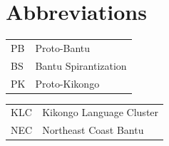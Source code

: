 \documentclass[output=paper,colorlinks,citecolor=brown
]{langscibook}
\begin{document}
 

\section*{Abbreviations}

\begin{tabularx}{.45\textwidth}{lQ}
PB & Proto-Bantu                \\
BS & Bantu Spirantization       \\
PK & Proto-Kikongo              \\
\end{tabularx}
\begin{tabularx}{.45\textwidth}{lQ}
KLC & Kikongo Language Cluster    \\
NEC & Northeast Coast Bantu       \\
\end{tabularx}






\sloppy %

\printbibliography[heading=subbibliography,notkeyword=this]
\end{document}
